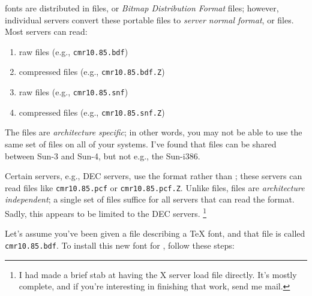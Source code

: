 {\X} fonts are distributed in {\BDF} files, or {\em Bitmap Distribution
Format} files; however, individual servers convert these portable
{\BDF} files to {\em server normal format},
or {\SNF} files.
Most servers can read:
\begin{enumerate}
\item raw {\BDF} files (e.g., {\tt cmr10.85.bdf})
\item compressed {\BDF} files (e.g., {\tt cmr10.85.bdf.Z})
\item raw {\SNF} files (e.g., {\tt cmr10.85.snf})
\item compressed {\SNF} files (e.g., {\tt cmr10.85.snf.Z})
\end{enumerate}
The {\SNF} files are {\em architecture specific}; in other words, you
may not be able to use the same set of {\SNF} files on all of your
systems. I've found that {\SNF} files can be shared between
Sun-3 and Sun-4, but not e.g., the Sun-i386.

Certain {\X} servers, e.g., DEC {\X} servers,
use the {\PCF} format rather than {\SNF}; these
servers can read files like
{\tt cmr10.85.pcf} or
{\tt cmr10.85.pcf.Z}.
Unlike {\SNF} files, {\PCF} files are {\em architecture independent};
a single set of {\PCF} files suffice for all servers that can read
the {\PCF} format. Sadly, this appears to be limited to the DEC {\X}
servers.%
\footnote{I had made a brief stab at having the X server load {\PK} file
directly. It's mostly complete,
and if you're interesting in finishing that work, send me mail.}%

Let's assume you've been given a {\BDF} file describing
a {\TeX} font, and that  file is called {\tt cmr10.85.bdf}.
To install this new font for {\X}, follow these steps:

